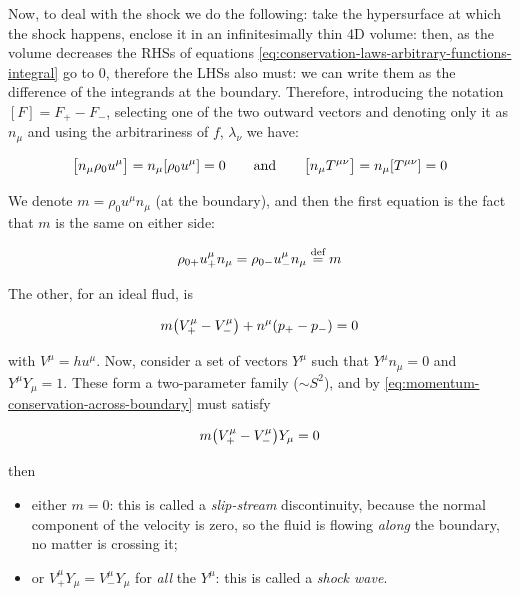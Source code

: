 \documentclass[main.tex]{subfiles}
\begin{document}
Now, to deal with the shock we do the following: take the hypersurface at which the shock happens, enclose it in an infinitesimally thin 4D volume: then, as the volume decreases the RHSs of equations \eqref{eq:conservation-laws-arbitrary-functions-integral} go to 0, therefore the LHSs also must: we can write them as the difference of the integrands at the boundary.
Therefore, introducing the notation \([F] = F_+ - F_-\), selecting one of the two outward vectors and denoting only it as \(n_\mu\) and using the arbitrariness of \(f\), \(\lambda_\nu\) we have:

\begin{equation}
    \qty[n_\mu \rho_0 u^\mu] = n_\mu \qty[\rho_0 u^\mu] = 0
    \qquad
    \text{and}
    \qquad
    \qty[n_\mu T^{\mu\nu}] = n_\mu [T^{\mu\nu}] = 0
\end{equation}

We denote \(m = \rho_0 u^\mu n_\mu\) (at the boundary), and then the first equation is the fact that \(m\) is the same on either side:

\begin{equation} \label{eq:rankine-hugoniot-1}
    \rho_{0+} u^\mu_+ n_\mu =
    \rho_{0-} u^\mu_- n_\mu \stackrel{\text{def}}{=} m
\end{equation}

The other, for an ideal flud, is

\begin{equation} \label{eq:momentum-conservation-across-boundary}
    m \qty(V^\mu_+ - V^\mu _-) + n^\mu \qty(p_+ - p_-) = 0
\end{equation}

with \(V^\mu = h u^\mu\). Now, consider a set of vectors \(Y^\mu\) such that \(Y^\mu n_\mu = 0\) and \(Y^\mu Y_\mu = 1\). These form a two-parameter family (\(\sim S^2\)), and
by \eqref{eq:momentum-conservation-across-boundary} must satisfy

\begin{equation}
    m \qty(V^\mu_+ - V^\mu _-) Y_\mu = 0
\end{equation}

then
\begin{itemize}
    \item either \(m = 0\): this is called a \emph{slip-stream} discontinuity, because the normal component of the velocity is zero, so the fluid is flowing \emph{along} the boundary, no matter is crossing it;
    \item  or \(V^\mu _+ Y_\mu = V^\mu _- Y_\mu\) for \emph{all} the \(Y^\mu\): this is called a \emph{shock wave}.
\end{itemize}
\end{document}

